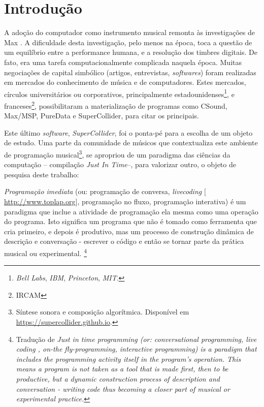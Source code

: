 \chapter*[Introdução]{Introdução}

A adoção do computador como instrumento musical remonta às investigações de Max .  A dificuldade desta investigação, pelo menos na época, toca a questão de um equilíbrio entre a performance humana, e a resolução dos timbres digitais. De fato, era uma tarefa computacionalmente complicada naquela época. Muitas negociações de capital simbólico (artigos, entrevistas, \emph{softwares}) foram realizadas em mercados do conhecimento de música e de computadores. Estes mercados, círculos universitários ou corporativos, principalmente estadounidenses\footnote{\emph{Bell Labs}, \emph{IBM}, \emph{Princeton}, \emph{MIT}.}, e franceses\footnote{IRCAM}, possibilitaram a materialização de programas como CSound, Max/MSP, PureData e SuperCollider, para citar os principais.

Este último \emph{software}, \emph{SuperCollider}, foi o ponta-pé para a escolha de um objeto de estudo. Uma parte da comunidade de músicos que contextualiza este ambiente de programação musical\footnote{Síntese sonora e composição algorítmica. Disponível em \url{https://supercollider.github.io}.}, se apropriou de um paradigma das ciências da computação -- compilação \emph{Just In Time}--, para valorizar outro, o objeto de pesquisa deste trabalho:

\begin{citacao}
\emph{Programação imediata} (ou: programação de conversa, \emph{livecoding} $[$\url{http://www.toplap.org}$]$, programação no fluxo, programação interativa) é um paradigma que inclue a atividade de programação ela mesma como uma operação do programa. Isto significa um programa que não é tomado como ferramenta que cria primeiro, e depois é produtivo, mas um processo de construção dinâmica de descrição e conversação - escrever o código e então se tornar parte da prática musical ou experimental. \cite[Verbete JITLib]{supercollider.org_supercollider_2014}\footnote{Tradução de \emph{Just in time programming (or: conversational programming, live coding , on-the fly-programming, interactive programming) is a paradigm that includes the programming activity itself in the program's operation. This means a program is not taken as a tool that is made first, then to be productive, but a dynamic construction process of description and conversation - writing code thus becoming a closer part of musical or experimental practice.}}
\end{citacao}

